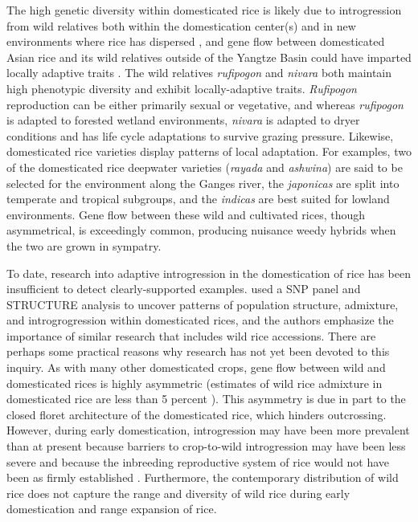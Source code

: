 \documentclass[11pt]{article}
\begin{document}
\begin{enumerate}
The high genetic diversity within domesticated rice is likely due to introgression from wild relatives both within the domestication center(s) and in new environments where rice has dispersed \cite{second1982origin}, and gene flow between domesticated Asian rice and its wild relatives outside of the Yangtze Basin could have imparted locally adaptive traits \cite{vaughan2008evolving}.
The wild relatives \emph{rufipogon} and \emph{nivara} both maintain high phenotypic diversity and exhibit locally-adaptive traits.
\emph{Rufipogon} reproduction can be either primarily sexual or vegetative, and whereas \emph{rufipogon} is adapted to forested wetland environments, \emph{nivara} is adapted to dryer conditions and has life cycle adaptations to survive grazing pressure.
Likewise, domesticated rice varieties display patterns of local adaptation.
For examples, two of the domesticated rice deepwater varieties (\emph{rayada} and \emph{ashwina}) are said to be selected for the environment along the Ganges river, the \emph{japonicas} are split into temperate and tropical subgroups, and the \emph{indicas} are best suited for lowland environments.
Gene flow between these wild and cultivated rices, though asymmetrical, is exceedingly common, producing nuisance weedy hybrids when the two are grown in sympatry.



To date, research into adaptive introgression in the domestication of rice has been insufficient to detect clearly-supported examples.
\cite{zhao2010genomic} used a SNP panel and STRUCTURE analysis to uncover patterns of population structure, admixture, and introgrogression within domesticated rices, and the authors emphasize the importance of similar research that includes wild rice accessions.
There are perhaps some practical reasons why research has not yet been devoted to this inquiry.
As with many other domesticated crops, gene flow between wild and domesticated rices is highly asymmetric (estimates of wild rice admixture in domesticated rice are less than 5 percent \cite{wang2017asian}).
This asymmetry is due in part to the closed floret architecture of the domesticated rice, which hinders outcrossing.
However, during early domestication, introgression may have been more prevalent than at present because barriers to crop-to-wild introgression may have been less severe and because the inbreeding reproductive system of rice would not have been as firmly established \cite{vaughan2008evolving}.
Furthermore, the contemporary distribution of wild rice does not capture the range and diversity of wild rice during early domestication and range expansion of rice.












\end{enumerate}
\end{document}
